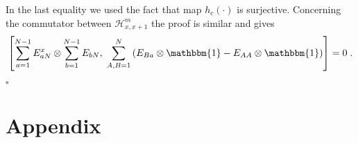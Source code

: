 \documentclass[10pt]{article}
\numberwithin{equation}{section}
\numberwithin{equation}{subsection}
\newcommand{\dt}{\;.}
\begin{document}
In the last equality we used the fact that map $h_{c}(\cdot)$ is surjective. 
Concerning the commutator between $\mathcal{H}_{x,x+1}^{m}$ the proof is similar and gives
\begin{equation}
	\left[\sum_{a=1}^{N-1}E_{aN}^{x}\otimes \sum_{b=1}^{N-1}E_{bN},\;\sum_{A,B=1}^{N}\left(E_{B a}\otimes \mathbbm{1}-E_{AA}\otimes \mathbbm{1}\right)\right]=0\dt
\end{equation}
\begin{flushright}
	$\square$
\end{flushright}













\appendix
\section*{Appendix}
\end{document}
